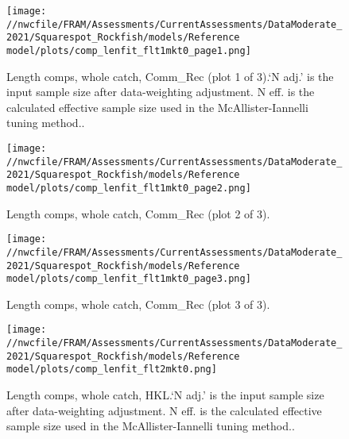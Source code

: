 \documentclass[11pt,
  english,
  a4paper,
]{article}
\begin{document}
\begin{figure}
\centering
\texttt{[image: //nwcfile/FRAM/Assessments/CurrentAssessments/DataModerate\_2021/Squarespot\_Rockfish/models/Reference model/plots/comp\_lenfit\_flt1mkt0\_page1.png]}
\caption{Length comps, whole catch, Comm\_Rec (plot 1 of 3).`N adj.' is the input sample size after data-weighting adjustment. N eff. is the calculated effective sample size used in the McAllister-Iannelli tuning method..\label{fig:comp_lenfit_flt1mkt0_page1}}
\end{figure}

\tagmcend\tagstructend


\begin{figure}
\centering
\texttt{[image: //nwcfile/FRAM/Assessments/CurrentAssessments/DataModerate\_2021/Squarespot\_Rockfish/models/Reference model/plots/comp\_lenfit\_flt1mkt0\_page2.png]}
\caption{Length comps, whole catch, Comm\_Rec (plot 2 of 3).\label{fig:comp_lenfit_flt1mkt0_page2}}
\end{figure}

\tagmcend\tagstructend


\begin{figure}
\centering
\texttt{[image: //nwcfile/FRAM/Assessments/CurrentAssessments/DataModerate\_2021/Squarespot\_Rockfish/models/Reference model/plots/comp\_lenfit\_flt1mkt0\_page3.png]}
\caption{Length comps, whole catch, Comm\_Rec (plot 3 of 3).\label{fig:comp_lenfit_flt1mkt0_page3}}
\end{figure}

\tagmcend\tagstructend


\begin{figure}
\centering
\texttt{[image: //nwcfile/FRAM/Assessments/CurrentAssessments/DataModerate\_2021/Squarespot\_Rockfish/models/Reference model/plots/comp\_lenfit\_flt2mkt0.png]}
\caption{Length comps, whole catch, HKL.`N adj.' is the input sample size after data-weighting adjustment. N eff. is the calculated effective sample size used in the McAllister-Iannelli tuning method..\label{fig:comp_lenfit_flt2mkt0}}
\end{figure}

\tagmcend\tagstructend
\end{document}
